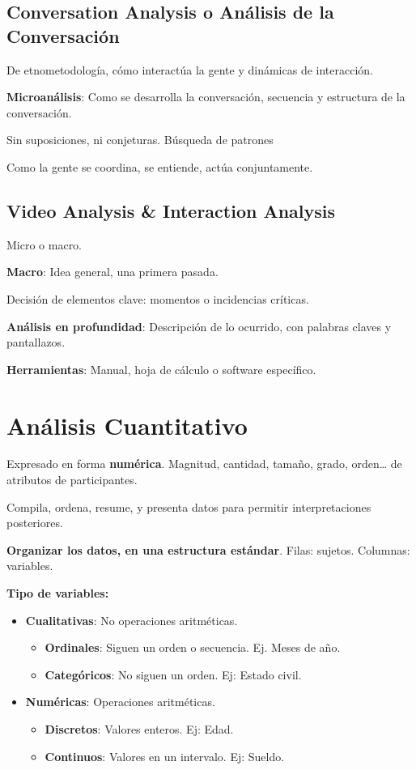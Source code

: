 \documentclass[12pt, twoside, openright]{report} %
\begin{document}
\subsection{Conversation Analysis o Análisis de la
	Conversación}

De etnometodología, cómo interactúa la gente y dinámicas de interacción.

\textbf{Microanálisis}: Como se desarrolla la conversación, secuencia y
estructura de la conversación.

Sin suposiciones, ni conjeturas. Búsqueda de patrones

Como la gente se coordina, se entiende, actúa conjuntamente.

\subsection{Video Analysis \& Interaction
	Analysis}

Micro o macro.

\textbf{Macro}: Idea general, una primera pasada.

Decisión de elementos clave: momentos o incidencias críticas.

\textbf{Análisis en profundidad}: Descripción de lo ocurrido, con
palabras claves y pantallazos.

\textbf{Herramientas}: Manual, hoja de cálculo o software específico.

\section{Análisis Cuantitativo}

Expresado en forma \textbf{numérica}. Magnitud, cantidad, tamaño, grado,
orden\ldots{} de atributos de participantes.

Compila, ordena, resume, y presenta datos para permitir interpretaciones
posteriores.

\textbf{Organizar los datos, en una estructura estándar}. Filas: sujetos. Columnas: variables.

\textbf{Tipo de variables:}

\begin{itemize}
	\item \textbf{Cualitativas}: No operaciones aritméticas.

	      \begin{itemize}
		      \item \textbf{Ordinales}: Siguen un orden o secuencia. Ej. Meses de año.
		      \item \textbf{Categóricos}: No siguen un orden. Ej: Estado civil.
	      \end{itemize}
	\item \textbf{Numéricas}: Operaciones aritméticas.

	      \begin{itemize}
		      \item \textbf{Discretos}: Valores enteros. Ej: Edad.
		      \item \textbf{Continuos}: Valores en un intervalo. Ej: Sueldo.
	      \end{itemize}
\end{itemize}
\end{document}
